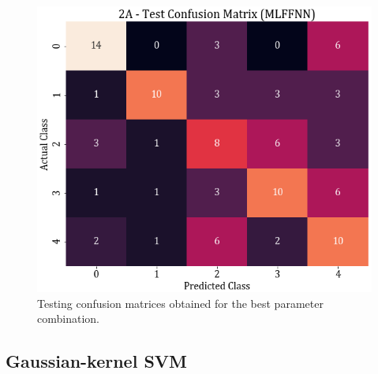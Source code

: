 \documentclass[11pt,a4paper]{article}
\begin{document}
\begin{figure}[H]
    \centering
    \includegraphics[scale=0.45]{images/2A_MLFFNN_test_confmat.png}
    \caption{Testing confusion matrices obtained for the best parameter combination.}
\end{figure}


\subsection{Gaussian-kernel SVM}
\end{document}
